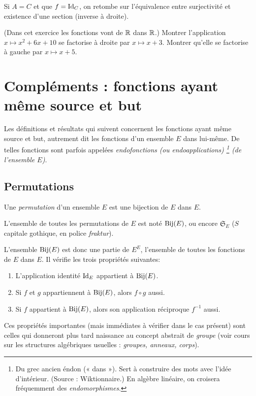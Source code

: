 \begin{remarque}
Si $A = C$ et que $f = \operatorname{Id}_C$, on retombe sur l'équivalence entre surjectivité et existence d'une section (inverse à droite).
\end{remarque}

\begin{exercice} 
(Dans cet exercice les fonctions vont de $\mathbb{R}$ dans $\mathbb{R}$.) 
Montrer l'application $x\mapsto x^2+6x+10$ se factorise à droite par $x\mapsto x+3$.
 Montrer qu'elle se factorise à gauche par $x\mapsto x+5$.
\end{exercice}






\section{Compléments : fonctions ayant même source et but}



Les définitions et résultats qui suivent concernent les fonctions ayant même source et but, autrement dit les fonctions d'un ensemble $E$ dans lui-même. De telles fonctions sont parfois appelées \emph{endofonctions (ou endoapplications) 
\footnote{Du grec ancien éndon (« dans »). Sert à construire des mots avec l’idée d’intérieur. (Source : Wiktionnaire.) En algèbre linéaire, on croisera fréquemment des \emph{endomorphismes}.}
 (de l'ensemble $E$)}.


\subsection{Permutations}

\begin{definition}
Une \emph{permutation} d'un ensemble $E$ est une bijection de $E$ dans $E$. 
\end{definition}

L'ensemble de toutes les permutations de $E$ est noté $\operatorname{Bij}(E)$, ou encore $\mathfrak S_E$ ($S$ capitale gothique, en police \emph{fraktur}).

L'ensemble $\operatorname{Bij}(E)$ est donc une partie de $E^E$, l'ensemble de toutes les fonctions de $E$ dans $E$. Il vérifie les trois propriétés suivantes:
\begin{enumerate}
\item L'application identité $\operatorname{Id}_E$ appartient à $\operatorname{Bij}(E)$.
\item Si $f$ et $g$ appartiennent à $\operatorname{Bij}(E)$, alors $f\circ g$ aussi.
\item Si $f$ appartient à $\operatorname{Bij}(E)$, alors son application réciproque $f^{-1}$ aussi.
\end{enumerate}
Ces propriétés importantes (mais immédiates à vérifier dans le cas présent) sont celles qui donneront plus tard naissance au concept abstrait de \emph{groupe} (voir cours sur les structures algébriques usuelles : \emph{groupes, anneaux, corps}).



